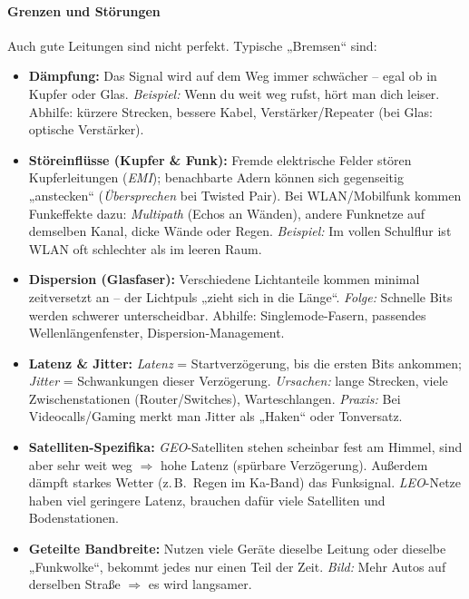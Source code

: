 \documentclass[../skript/main.tex]{subfiles}
\begin{document}
	

	
\paragraph{Grenzen und Störungen}
Auch gute Leitungen sind nicht perfekt. Typische „Bremsen“ sind:

\begin{itemize}
	\item \textbf{Dämpfung:} Das Signal wird auf dem Weg immer schwächer – egal ob in Kupfer oder Glas.
	\emph{Beispiel:} Wenn du weit weg rufst, hört man dich leiser. Abhilfe: kürzere Strecken, bessere Kabel,
	Verstärker/Repeater (bei Glas: optische Verstärker).
	
	\item \textbf{Störeinflüsse (Kupfer \& Funk):} 
	Fremde elektrische Felder stören Kupferleitungen (\emph{EMI}); benachbarte Adern können sich gegenseitig „anstecken“
	(\emph{Übersprechen} bei Twisted Pair). Bei WLAN/Mobilfunk kommen Funkeffekte dazu: \emph{Multipath} (Echos an Wänden),
	andere Funknetze auf demselben Kanal, dicke Wände oder Regen.
	\emph{Beispiel:} Im vollen Schulflur ist WLAN oft schlechter als im leeren Raum.
	
	\item \textbf{Dispersion (Glasfaser):} Verschiedene Lichtanteile kommen minimal zeitversetzt an – der Lichtpuls „zieht sich in die Länge“.
	\emph{Folge:} Schnelle Bits werden schwerer unterscheidbar. Abhilfe: Singlemode-Fasern, passendes Wellenlängenfenster,
	Dispersion-Management.
	
	\item \textbf{Latenz \& Jitter:} \emph{Latenz} = Startverzögerung, bis die ersten Bits ankommen; \emph{Jitter} = Schwankungen dieser Verzögerung.
	\emph{Ursachen:} lange Strecken, viele Zwischenstationen (Router/Switches), Warteschlangen.
	\emph{Praxis:} Bei Videocalls/Gaming merkt man Jitter als „Haken“ oder Tonversatz.
	
	\item \textbf{Satelliten-Spezifika:} 
	\emph{GEO}-Satelliten stehen scheinbar fest am Himmel, sind aber sehr weit weg \(\Rightarrow\) hohe Latenz (spürbare Verzögerung).
	Außerdem dämpft starkes Wetter (z.\,B.\ Regen im Ka-Band) das Funksignal.
	\emph{LEO}-Netze haben viel geringere Latenz, brauchen dafür viele Satelliten und Bodenstationen.
	
	\item \textbf{Geteilte Bandbreite:} Nutzen viele Geräte dieselbe Leitung oder dieselbe „Funkwolke“, bekommt jedes nur einen Teil der Zeit.
	\emph{Bild:} Mehr Autos auf derselben Straße \(\Rightarrow\) es wird langsamer.
\end{itemize}
\end{document}
